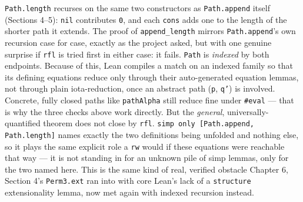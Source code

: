 \texttt{Path.length} recurses on the same two constructors as \texttt{Path.append} itself (Sections 4--5): \texttt{nil} contributes \texttt{0}, and each \texttt{cons} adds one to the length of the shorter path it extends. The proof of \texttt{append\_\allowbreak{}length} mirrors \texttt{Path.append}'s own recursion case for case, exactly as the project asked, but with one genuine surprise if \texttt{rfl} is tried first in either case: it fails. \texttt{Path} is \emph{indexed} by both endpoints. Because of this, Lean compiles a match on an indexed family so that its defining equations reduce only through their auto-generated equation lemmas, not through plain iota-reduction, once an abstract path (\texttt{p}, \texttt{q'}) is involved. Concrete, fully closed paths like \texttt{pathAlpha} still reduce fine under \texttt{\#eval} --- that is why the three checks above work directly. But the \emph{general}, universally-quantified theorem does not close by \texttt{rfl}. \texttt{simp only [Path.append, Path.length]} names exactly the two definitions being unfolded and nothing else, so it plays the same explicit role a \texttt{rw} would if these equations were reachable that way --- it is not standing in for an unknown pile of simp lemmas, only for the two named here. This is the same kind of real, verified obstacle Chapter 6, Section 4's \texttt{Perm3.ext} ran into with core Lean's lack of a \texttt{structure} extensionality lemma, now met again with indexed recursion instead.
